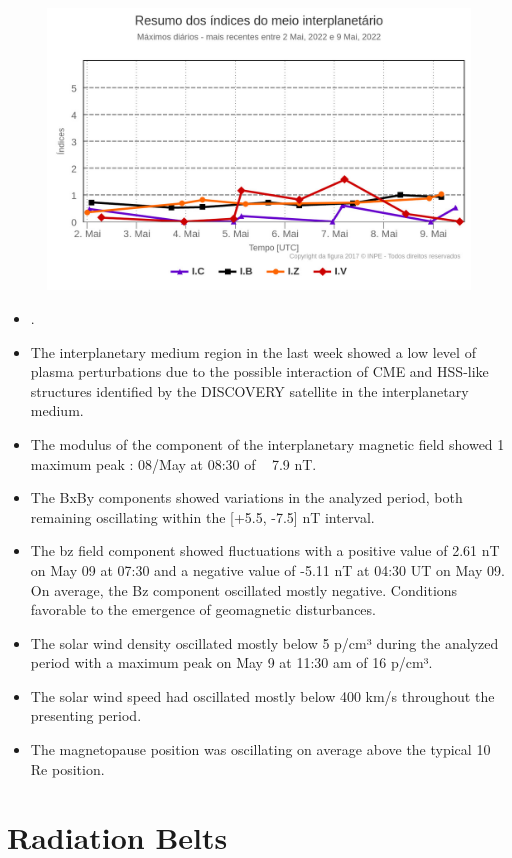\documentclass[11pt, oneside]{article}
\begin{document}
 \begin{figure}[H]
    \centering
    \includegraphics[width=14cm]{./figures//figureMIIndex.png}
\end{figure}
 \begin{itemize}
 \item .
\item The interplanetary medium region in the last week showed a low level of plasma perturbations due to the possible interaction of CME and HSS-like structures identified by the DISCOVERY satellite in the interplanetary medium.
\item  The modulus of the component of the interplanetary magnetic field showed 1 maximum peak : 08/May at 08:30 of ~ 7.9 nT. 
\item The BxBy components showed variations in the analyzed period, both remaining oscillating within the [+5.5, -7.5] nT interval.
\item  The bz field component showed fluctuations with a positive value of 2.61 nT on May 09 at 07:30 and a negative value of -5.11 nT at 04:30 UT on May 09. On average, the Bz component oscillated mostly negative. Conditions favorable to the emergence of geomagnetic disturbances.
\item  The solar wind density oscillated mostly below 5 p/cm³ during the analyzed period with a maximum peak on May 9 at 11:30 am of 16 p/cm³. 
\item The solar wind speed had oscillated mostly below 400 km/s throughout the presenting period. 
\item The magnetopause position was oscillating on average above the typical 10 Re position.
\end{itemize} 
\section{Radiation Belts} 
\end{document}
